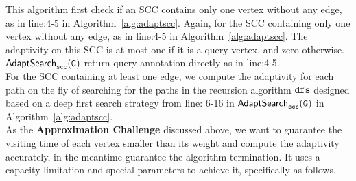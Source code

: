 This algorithm first check if an SCC contains only one vertex without any edge, as in line:4-5 in Algorithm~\ref{alg:adaptscc}.
Again, for 
the SCC containing only one vertex without any edge, as in line:4-5 in Algorithm~\ref{alg:adaptscc}.
The adaptivity on this SCC is at most one if it is a query vertex,
and zero otherwise.
$\mathtt{\mathsf{AdaptSearch}_{scc}(G)}$ return query annotation directly as in line:4-5.
\\
For the SCC containing at least one edge, 
we compute the adaptivity for each path 
on the fly of searching for the paths 
in the
recursion algorithm $\mathtt{dfs}$ designed based on 
a deep first search strategy 
from line: 6-16 in $\mathtt{\mathsf{AdaptSearch}_{scc}(G)}$ in Algorithm~\ref{alg:adaptscc}.
\\
%
As the \textbf{Approximation Challenge} discussed above, 
we want to guarantee the visiting time of each vertex smaller than 
its weight and compute the adaptivity accurately, in the meantime guarantee the algorithm termination. 
It uses a capacity limitation and  special parameters to achieve it,
specifically as follows.
